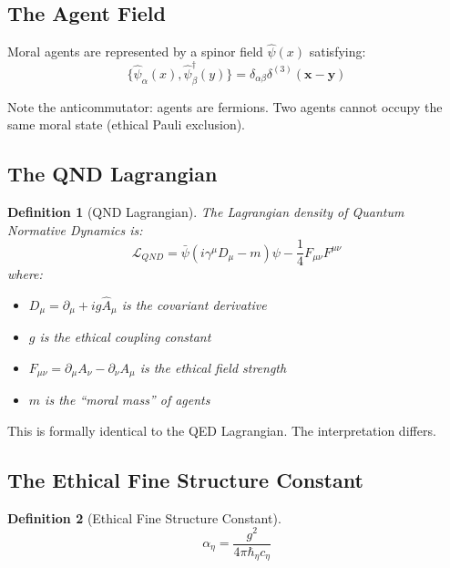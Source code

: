 \documentclass[12pt]{article}
\newtheorem{definition}{Definition}[section]
\begin{document}
\subsection{The Agent Field}

Moral agents are represented by a spinor field $\hat{\psi}(x)$ satisfying:
\begin{equation}
    \{\hat{\psi}_\alpha(x), \hat{\psi}_\beta^\dagger(y)\} = \delta_{\alpha\beta} \delta^{(3)}(\mathbf{x} - \mathbf{y})
\end{equation}

Note the anticommutator: agents are fermions. Two agents cannot occupy the same moral state (ethical Pauli exclusion).

\subsection{The QND Lagrangian}

\begin{definition}[QND Lagrangian]
The Lagrangian density of Quantum Normative Dynamics is:
\begin{equation}
    \mathcal{L}_{QND} = \bar{\psi}(i\gamma^\mu D_\mu - m)\psi - \frac{1}{4} F_{\mu\nu} F^{\mu\nu}
\end{equation}
where:
\begin{itemize}
    \item $D_\mu = \partial_\mu + ig\hat{A}_\mu$ is the covariant derivative
    \item $g$ is the ethical coupling constant
    \item $F_{\mu\nu} = \partial_\mu A_\nu - \partial_\nu A_\mu$ is the ethical field strength
    \item $m$ is the ``moral mass'' of agents
\end{itemize}
\end{definition}

This is formally identical to the QED Lagrangian. The interpretation differs.

\subsection{The Ethical Fine Structure Constant}

\begin{definition}[Ethical Fine Structure Constant]
\begin{equation}
    \alpha_\eta = \frac{g^2}{4\pi\hbar_\eta c_\eta}
\end{equation}
\end{definition}
\end{document}
